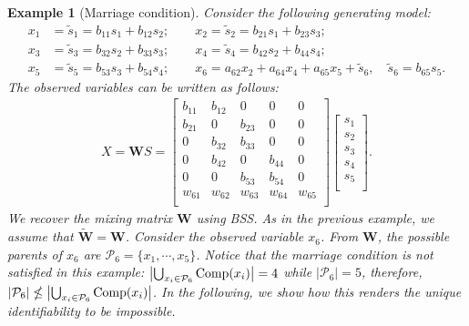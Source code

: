 \documentclass[12pt]{article}
\newtheorem{example}{Example}
\newcommand{\bW}{\mathbf{W}}
\begin{document}
\begin{example}[Marriage condition] \label{ex:marriage_condition}
Consider the following generating model:
\begin{equation}
\begin{aligned}
x_1 &= \tilde{s}_1 =  b_{11} s_1 + b_{12} s_2;\qquad 
x_2 = \tilde{s}_2 = b_{21} s_1 + b_{23} s_3; \\
x_3 &= \tilde{s}_3 = b_{32} s_2 + b_{33} s_3;\qquad 
x_4 = \tilde{s}_4 = b_{42} s_2 + b_{44} s_4;\\
x_5 &= \tilde{s}_5 = b_{53} s_3 + b_{54} s_4;\qquad 
x_6 = a_{62} x_2 + a_{64} x_4 + a_{65} x_5 + \tilde{s}_6,\quad \tilde{s}_6 =b_{65} s_5.
\end{aligned}
\label{eq:exammple5_05}
\end{equation}
The observed variables can be written as follows: 
\begin{align}
\label{eq:exammple5_1}
X = \bW S=
\begin{bmatrix}
b_{11} & b_{12} & 0 & 0 & 0 \\
b_{21} & 0 & b_{23} & 0 & 0 \\
0 & b_{32} & b_{33} & 0 & 0 \\
0 & b_{42}  & 0 & b_{44} & 0 \\
0 & 0  & b_{53} & b_{54} & 0 \\
w_{61} & w_{62} & w_{63} & w_{64} & w_{65} \\
\end{bmatrix}
\begin{bmatrix}
s_1 \\
s_2 \\
s_3 \\
s_4 \\
s_5 \\
\end{bmatrix}.
\end{align}
We recover the mixing matrix $\bW$ using BSS. As in the previous example, we assume that $\tilde{\bW}=\bW$. Consider the observed variable $x_6$. From $\bW$, the possible parents of $x_6$ are $\mathcal{P}_6= \{x_1,\cdots,x_5\}$. Notice that the marriage condition is not satisfied in this example: $\left| \bigcup_{x_i \in \mathcal{P}_6}{\rm{Comp}}(x_i)\right|=4$ while $|\mathcal{P}_6|=5$, therefore, $|\mathcal{P}_6|\nleq \left|\bigcup_{x_i \in \mathcal{P}_6} {\rm{Comp}}(x_i)\right|$. In the following, we show how this renders the unique identifiability to be impossible. 


\end{example}
\end{document}
